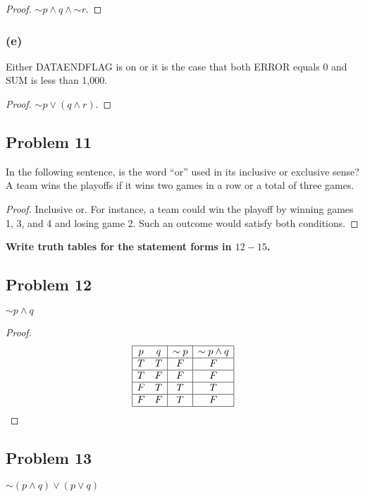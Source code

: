 \documentclass[14pt]{extarticle}
\begin{document}
\begin{proof}
${\sim p} \wedge q \wedge {\sim r}$.
\end{proof}

\subsubsection{(e)}
Either DATAENDFLAG is on or it is the case that both ERROR equals 0 and SUM is less than 1,000.

\begin{proof}
${\sim p} \vee (q \wedge r)$.
\end{proof}

\subsection{Problem 11}
In the following sentence, is the word ``or'' used in its inclusive or exclusive sense? A team wins the playoffs if it wins two games in a row or a total of three games.

\begin{proof}
Inclusive or. For instance, a team could win the playoff by winning games 1, 3, and 4 and losing game 2. Such an outcome would satisfy both conditions.
\end{proof}

{\bf Write truth tables for the statement forms in $12-15$.}

\subsection{Problem 12}
${\sim p} \wedge q$

\begin{proof}
$$
\begin{array}{|cc|c|c|}
\hline
p & q & {\sim p} & {\sim p} \wedge q \\
\hline
T & T & F & F \\
\hline
T & F & F & F \\
\hline
F & T & T & T \\
\hline
F & F & T & F \\
\hline
\end{array}
$$
\end{proof}

\subsection{Problem 13}
${\sim(p \wedge q)} \vee (p \vee q)$
\end{document}

